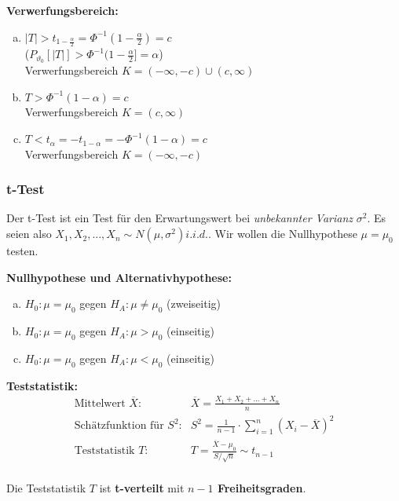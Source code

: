 \documentclass[10pt,a4paper,twocolumn]{article}
\begin{document}
\textbf{Verwerfungsbereich:}
\begin{enumerate}[a)]
\item $|T|>t_{1-\frac{\alpha}{2}}=\Phi^{-1}(1-\frac{\alpha}{2})=c$ \\ 
      ($P_{\vartheta_0}[|T|]>\Phi^{-1}(1-\frac{\alpha}{2}]=\alpha$) \\
      Verwerfungsbereich $K=(-\infty,-c) \cup (c,\infty)$
\item $T>\Phi^{-1}(1-\alpha)=c$ \\
      Verwerfungsbereich $K=(c,\infty)$
\item $T<t_{\alpha}=-t_{1-\alpha}=-\Phi^{-1}(1-\alpha)=c$ \\
      Verwerfungsbereich $K=(-\infty,-c)$
\end{enumerate}

\subsubsection{t-Test}
Der t-Test ist ein Test für den Erwartungswert bei \emph{unbekannter Varianz} $\sigma^2$. Es seien also $X_1,X_2,...,X_n \sim N(\mu,\sigma^2) i.i.d.$. Wir wollen die Nullhypothese $\mu=\mu_0$ testen.

\vspace{10pt}

\textbf{Nullhypothese und Alternativhypothese:}
\begin{enumerate}[a)]
\item $H_0: \mu=\mu_0$ gegen $H_A:\mu\neq \mu_0$ (zweiseitig)
\item $H_0: \mu=\mu_0$ gegen $H_A:\mu > \mu_0$ (einseitig)
\item $H_0: \mu=\mu_0$ gegen $H_A:\mu < \mu_0$ (einseitig)
\end{enumerate}

\vspace{10pt}

\textbf{Teststatistik:}
\[
\begin{array}{ll}
	\text{Mittelwert $\overline{X}$:} & \overline{X}=\frac{X_1+X_2+...+X_n}{n} \\
	\text{Schätzfunktion für $S^2$:} & S^2 = \frac{1}{n-1}\cdot \sum\limits_{i=1}^{n}(X_i - \overline{X})^2 \\
	\text{Teststatistik $T$:} & T = \frac{\overline{X}-\mu_0}{S/\sqrt{n}}\sim t_{n-1} \\
\end{array}
\]

Die Teststatistik $T$ ist \textbf{t-verteilt} mit \textbf{$n-1$ Freiheitsgraden}.
\end{document}
